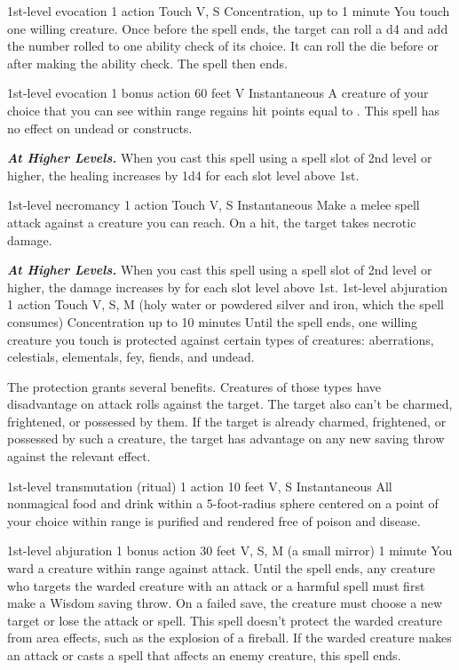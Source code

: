 \documentclass[10pt,twoside,twocolumn,openany]{book}
\newcommand{\castingModifier}{3}
\newcommand\impact[1]{
	\textbf{\textit{#1}}
}
\begin{document}
{1st-level evocation}
{\color{action} 1 action}
{Touch}
{V, S}
{{\color{concentration}Concentration}, up to 1 minute}
%
You touch one willing creature. Once before the spell ends, the target can roll a d4 and add the number rolled to one ability check of its choice. It can roll the die before or after making the ability check. The spell then ends.

{1st-level evocation}
{\color{bonusaction} 1 bonus action}
{60 feet}
{V}
{Instantaneous}
%
A creature of your choice that you can see within range regains hit points equal to \dice{1d4 + \castingModifier}. This spell has no effect on undead or constructs.

\impact{At Higher Levels.} When you cast this spell using a spell slot of 2nd level or higher, the healing increases by 1d4 for each slot level above 1st.

{1st-level necromancy}
{\color{action} 1 action}
{Touch}
{V, S}
{Instantaneous}
%
Make a melee spell attack against a creature you can reach. On a hit, the target takes  necrotic damage.

\impact{At Higher Levels.} When you cast this spell using a spell slot of 2nd level or higher, the damage increases by
 for each slot level above 1st.
\newpage
{}
{1st-level abjuration}
{\color{action} 1 action}
{Touch}
{V, S, M (holy water or powdered silver and iron, which the spell consumes)}
{{\color{concentration}Concentration} up to 10 minutes}
%
Until the spell ends, one willing creature you touch is protected against certain types of creatures: aberrations, celestials, elementals, fey, fiends, and undead.

The protection grants several benefits. Creatures of those types have disadvantage on attack rolls against the target. The target also can't be charmed, frightened, or possessed by them. If the target is already charmed, frightened, or possessed by such a creature, the target has advantage on any new saving throw against the relevant effect.

{1st-level transmutation {\color{ritual}(ritual)}}
{\color{action} 1 action}
{10 feet}
{V, S}
{Instantaneous}
%
All nonmagical food and drink within a 5-foot-radius sphere centered on a point of your choice within range is purified and rendered free of poison and disease.

{1st-level abjuration}
{\color{bonusaction}1 bonus action}
{30 feet}
{V, S, M (a small mirror)}
{1 minute}
%
You ward a creature within range against attack. Until the spell ends, any creature who targets the warded creature with an attack or a harmful spell must first make a Wisdom saving throw. On a failed save, the creature must choose a new target or lose the attack or spell. This spell doesn't protect the warded creature from area effects, such as the explosion of a fireball. If the warded creature makes an attack or casts a spell that affects an enemy creature, this spell ends.
\end{document}
